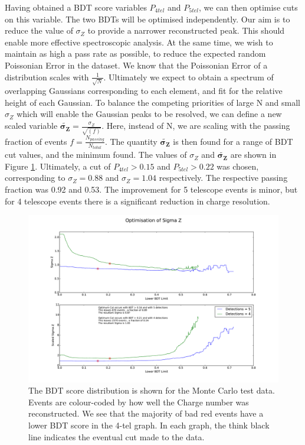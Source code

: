 \documentclass[11pt]{article}
\begin{document}
Having obtained a BDT score variables $P_{4tel}$ and $P_{5tel}$, we can then optimise cuts on this variable. The two BDTs will be optimised independently. Our aim is to reduce the value of $\sigma_{Z}$ to provide a narrower reconstructed peak. This should enable more effective spectroscopic analysis. At the same time, we wish to maintain as high a pass rate as possible, to reduce the expected random Poissonian Error in the dataset. We know that the Poissonian Error of a distribution scales with $\frac{1}{\sqrt{N}}$. Ultimately we expect to obtain a spectrum of overlapping Gaussians corresponding to each element, and fit for the relative height of each Gaussian. To balance the competing priorities of large N and small $\sigma_{Z}$ which will enable the Gaussian peaks to be resolved, we can define a new scaled variable $\mathbf{\tilde{\sigma_{Z}}} = \frac{\sigma_{Z}}{\sqrt{(f)}}$. Here, instead of N, we are scaling with the passing fraction of events $f = \frac{N_{passing}}{N_{total}}$. The quantity $\mathbf{\tilde{\sigma_{Z}}}$ is then found for a range of BDT cut values, and the minimum found. The values of $\sigma_{Z}$ and $\mathbf{\tilde{\sigma_{Z}}}$ are shown in Figure \ref{fig:Zcuts}. Ultimately, a cut of $P_{4tel} > 0.15$ and $P_{5tel} > 0.22$ was chosen, corresponding to $\sigma_{Z}=0.88$ and $\sigma_{Z}=1.04$ respectively. The respective passing fraction was 0.92 and 0.53. The improvement for 5 telescope events is minor, but for 4 telescope events there is a significant reduction in charge resolution.

\begin{figure}
\begin{center}
\includegraphics[width=\textwidth]{Zcuts}
\caption{The BDT score distribution is shown for the Monte Carlo test data. Events are colour-coded by how well the Charge number was reconstructed. We see that the majority of bad red events have a lower BDT score in the 4-tel graph. In each graph, the think black line indicates the eventual cut made to the data.}
\label{fig:Zcuts}
\end{center}
\end{figure}
\end{document}
